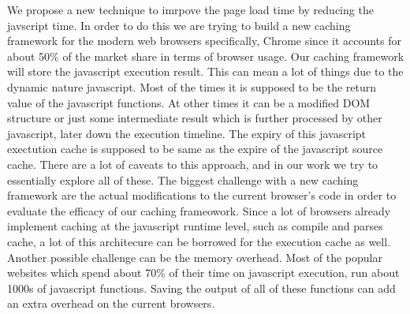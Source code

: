 We propose a new technique to imrpove the page load time by reducing
the javscript time.  In order to do this we are trying to build a new
caching framework for the modern web browsers specifically, Chrome
since it accounts for about 50\% of the market share in terms of
browser usage. Our caching framework will store the javascript
execution result. This can mean a lot of things due to the dynamic
nature javascript. Most of the times it is supposed to be the return
value of the javascript functions. At other times it can be a modified
DOM structure or just some intermediate result which is further
processed by other javascript, later down the execution timeline.  The
expiry of this javascript exectution cache is supposed to be same as
the expire of the javascript source cache.  There are a lot of caveats
to this approach, and in our work we try to essentially explore all of
these.  The biggest challenge with a new caching framework are the
actual modifications to the current browser's code in order to
evaluate the efficacy of our caching frameowork. Since a lot of
browsers already implement caching at the javascript runtime level,
such as compile and parses cache, a lot of this architecure can be
borrowed for the execution cache as well.  Another possible challenge
can be the memory overhead. Most of the popular websites which spend
about 70\% of their time on javascript execution, run about 1000s of
javascript functions. Saving the output of all of these functions can
add an extra overhead on the current browsers. 
